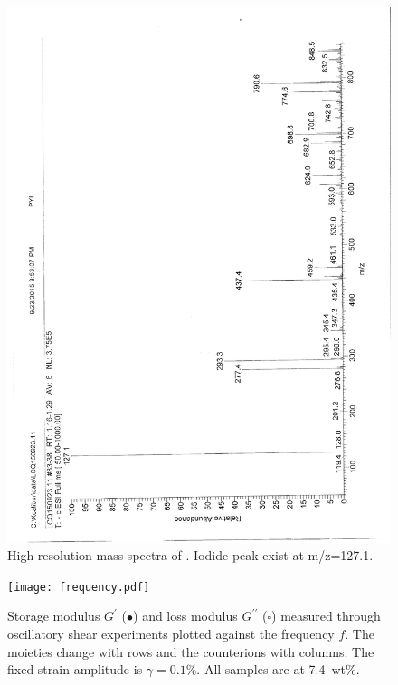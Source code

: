 \documentclass[journal=jacsat,manuscript=article]{achemso}
\begin{document}
\begin{figure}
\includegraphics[height=\textheight-2\baselineskip]{mass_PPyI.png}
\caption{High resolution mass spectra of . Iodide peak exist at m/z=127.1.}
\label{fig:massPPyI}
\end{figure}

\begin{figure}
\texttt{[image: frequency.pdf]}
\caption{Storage modulus $G^\prime$ ($\bullet$) and loss modulus $G^{\prime\prime}$ ($\square$) measured through oscillatory shear experiments plotted against the frequency $f$. The moieties change with rows and the counterions with columns. The fixed strain amplitude is $\gamma=0.1\%$. All samples are at 7.4~wt\%. }
\label{fig:frequency}
\end{figure}
\end{document}
